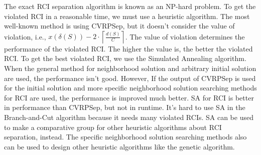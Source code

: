 \documentclass[11pt]{article}
\begin{document}
\begin{spacing}{1.5}
The exact RCI separation algorithm is known as an NP-hard problem. To get the violated RCI in a reasonable time, we must use a heuristic algorithm. The most well-known method is using CVRPSep, but it doesn't consider the value of violation, i.e., $x(\delta(S)) - 2\cdot\left\lceil\frac{d(S)}{C}\right\rceil$. The value of violation determines the performance of the violated RCI. The higher the value is, the better the violated RCI. 
To get the best violated RCI, we use the Simulated Annealing algorithm. When the general method for neighborhood solution and arbitrary initial solution are used, the performance isn't good. However, If the output of CVRPSep is used for the initial solution and more specific neighborhood solution searching methods for RCI are used, the performance is improved much better. SA for RCI is better in performance than CVRPSep, but not in runtime. It's hard to use SA in the Branch-and-Cut algorithm because it needs many violated RCIs. SA can be used to make a comparative group for other heuristic algorithms about RCI separation, instead. The specific neighborhood solution searching methods also can be used to design other heuristic algorithms like the genetic algorithm. 

\newpage





\end{spacing}
\end{document}
